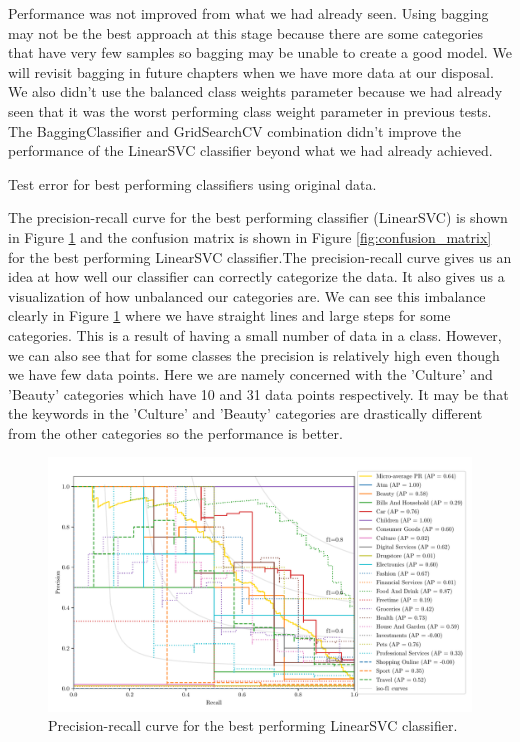Performance was not improved from what we had already seen. Using bagging may not be the best approach at this stage because there are some categories that have very few samples so bagging may be unable to create a good model. We will revisit bagging in future chapters when we have more data at our disposal. We also didn't use the balanced class weights parameter because we had already seen that it was the worst performing class weight parameter in previous tests. The BaggingClassifier and GridSearchCV combination didn't improve the performance of the LinearSVC classifier beyond what we had already achieved.

\begin{table}[ht]
\centering
\caption{Test error for best performing classifiers using original data.}

\label{tab:best_errors}
\end{table}

The precision-recall curve for the best performing classifier (LinearSVC) is shown in Figure \ref{fig:pr_curve} and the confusion matrix is shown in Figure \ref{fig:confusion_matrix} for the best performing LinearSVC classifier.The precision-recall curve gives us an idea at how well our classifier can correctly categorize the data. It also gives us a visualization of how unbalanced our categories are. We can see this imbalance clearly in Figure \ref{fig:pr_curve} where we have straight lines and large steps for some categories. This is a result of having a small number of data in a class. However, we can also see that for some classes the precision is relatively high even though we have few data points. Here we are namely concerned with the 'Culture' and 'Beauty' categories which have 10 and 31 data points respectively. It may be that the keywords in the 'Culture' and 'Beauty' categories are drastically different from the other categories so the performance is better. 

\begin{figure}[ht]
  \centering
  \includegraphics[width=\scale\textwidth]{../img/plot_pr_curve.pdf}
  \caption{Precision-recall curve for the best performing LinearSVC classifier.}
  \label{fig:pr_curve}
\end{figure}

